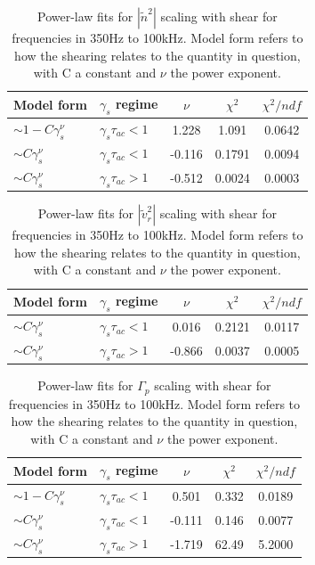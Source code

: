 \documentclass[aip,pop,amsmath,amssymb,preprint,superscriptaddress]{revtex4-1} %
\begin{document}
\begin{table}
\caption{\label{tab:table1}Power-law fits for $|\tilde{n}^{2}|$ scaling with shear for frequencies in 350Hz to 100kHz. Model form refers to how the shearing relates to the quantity in question, with C a constant and $\nu$ the power exponent.}
\begin{ruledtabular}
\begin{tabular}{llccc}
Model form&$\gamma_{s}$ regime&$\nu$&$\chi^2$&$\chi^2/ndf$\\
\hline
$\sim 1-C\gamma_{s}^\nu$&$\gamma_{s}\tau_{ac}<1$&1.228&1.091&0.0642\\
$\sim C\gamma_{s}^\nu$&$\gamma_{s}\tau_{ac}<1$&-0.116&0.1791&0.0094\\
$\sim C\gamma_{s}^\nu$&$\gamma_{s}\tau_{ac}>1$&-0.512&0.0024&0.0003\\
\end{tabular}
\end{ruledtabular}
\end{table}

\begin{table}
\caption{\label{tab:table2}Power-law fits for $|\tilde{v}_{r}^{2}|$ scaling with shear for frequencies in 350Hz to 100kHz. Model form refers to how the shearing relates to the quantity in question, with C a constant and $\nu$ the power exponent.}
\begin{ruledtabular}
\begin{tabular}{llccc}
Model form&$\gamma_{s}$ regime&$\nu$&$\chi^2$&$\chi^2/ndf$\\
\hline
$\sim C\gamma_{s}^\nu$&$\gamma_{s}\tau_{ac}<1$&0.016&0.2121&0.0117\\
$\sim C\gamma_{s}^\nu$&$\gamma_{s}\tau_{ac}>1$&-0.866&0.0037&0.0005\\
\end{tabular}
\end{ruledtabular}
\end{table}

\begin{table}
\caption{\label{tab:table3}Power-law fits for $\Gamma_{p}$ scaling with shear for frequencies in 350Hz to 100kHz. Model form refers to how the shearing relates to the quantity in question, with C a constant and $\nu$ the power exponent.}
\begin{ruledtabular}
\begin{tabular}{llccc}
Model form&$\gamma_{s}$ regime&$\nu$&$\chi^2$&$\chi^2/ndf$\\
\hline
$\sim 1-C\gamma_{s}^\nu$&$\gamma_{s}\tau_{ac}<1$ &0.501   &0.332    &0.0189\\
$\sim C\gamma_{s}^\nu$&$\gamma_{s}\tau_{ac}<1$   &-0.111  &0.146    &0.0077\\
$\sim C\gamma_{s}^\nu$&$\gamma_{s}\tau_{ac}>1$   &-1.719  &62.49    &5.2000\\
\end{tabular}
\end{ruledtabular}
\end{table}
\end{document}
